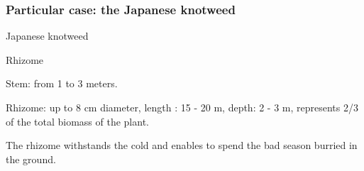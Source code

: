 \documentclass{myBeamer}
\begin{document}
\begin{frame}
\frametitle{Particular case: the Japanese knotweed}

\noindent
\begin{minipage}{0.45\linewidth}
Japanese knotweed
\begin{figure}[H] 
\end{figure}
\end{minipage}
\begin{minipage}{0.45\linewidth}
Rhizome
\begin{figure}[H] 
\end{figure}
\end{minipage}

\bigbreak

Stem: from 1 to 3 meters.

\smallbreak
Rhizome: up to 8 cm diameter, length : 15 - 20 m, depth: 2 - 3 m, represents 2/3 of the total biomass of the plant.

\smallbreak
The rhizome withstands the cold and enables to spend the bad season burried in the ground.
\end{frame}
\end{document}

